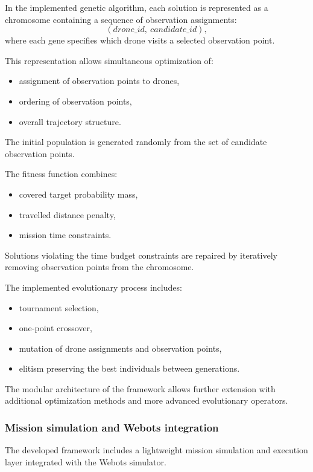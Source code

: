 \documentclass[english]{projectreport}
\begin{document}
In the implemented genetic algorithm, each solution is represented as a chromosome containing a sequence of observation assignments:
\[
(drone\_id,\ candidate\_id),
\]
where each gene specifies which drone visits a selected observation point.

This representation allows simultaneous optimization of:
\begin{itemize}
    \item assignment of observation points to drones,
    \item ordering of observation points,
    \item overall trajectory structure.
\end{itemize}

The initial population is generated randomly from the set of candidate observation points.

The fitness function combines:
\begin{itemize}
    \item covered target probability mass,
    \item travelled distance penalty,
    \item mission time constraints.
\end{itemize}

Solutions violating the time budget constraints are repaired by iteratively removing observation points from the chromosome.

The implemented evolutionary process includes:
\begin{itemize}
    \item tournament selection,
    \item one-point crossover,
    \item mutation of drone assignments and observation points,
    \item elitism preserving the best individuals between generations.
\end{itemize}

The modular architecture of the framework allows further extension with additional optimization methods and more advanced evolutionary operators.

\subsubsection{Mission simulation and Webots integration}

The developed framework includes a lightweight mission simulation and execution layer integrated with the Webots simulator.
\end{document}
